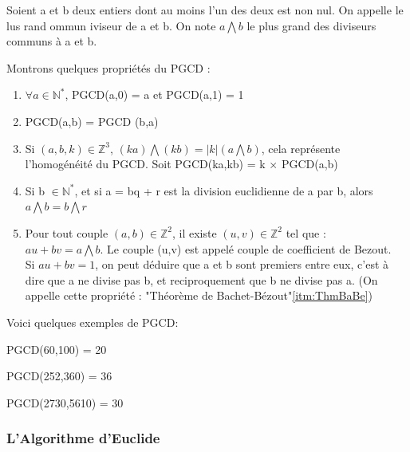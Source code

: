 \begin{definition} \normalfont
Soient a et b deux entiers dont au moins l'un des deux est non nul. On appelle  le lus rand ommun iviseur de a et b. On note $a \bigwedge b$ le plus grand des diviseurs communs à a et b.
\end{definition}

\begin{property} \normalfont
Montrons quelques propriétés du PGCD : 
\begin{enumerate} \normalfont
\item $\forall a \in \mathbb{N}^*$, PGCD(a,0) = a et PGCD(a,1) = 1
\item PGCD(a,b) = PGCD (b,a)
\item \label{prop:homopgcd}
Si $ (a,b,k) \in \mathbb{Z}^3$, $(ka) \bigwedge (kb) = |k|(a \bigwedge b)$, cela représente l'homogénéité du PGCD. Soit PGCD(ka,kb) = k $\times$ PGCD(a,b)
\item Si b $\in \mathbb{N}^*$, et si a = bq + r est la division euclidienne de a par b, alors $a \bigwedge b = b \bigwedge r$
\item Pour tout couple $(a,b) \in \mathbb{Z}^2$, il existe $(u,v) \in \mathbb{Z}^2$ tel que : \\
$au + bv = a \bigwedge b$. Le couple (u,v) est appelé couple de coefficient de Bezout. \\
Si $au + bv = 1$, on peut déduire que a et b sont premiers entre eux, c'est à dire que a ne divise pas b, et reciproquement que b ne divise pas a.
(On appelle cette propriété : "Théorème de Bachet-Bézout"\ref{itm:ThmBaBe})
\end{enumerate}
\end{property}

\begin{example} \normalfont
Voici quelques exemples de PGCD:
\item PGCD(60,100) = 20
\item PGCD(252,360) = 36 
\item PGCD(2730,5610) = 30
\end{example}


\subsubsection{L'Algorithme d'Euclide} \normalfont
\label{sec:algo_euclide}

